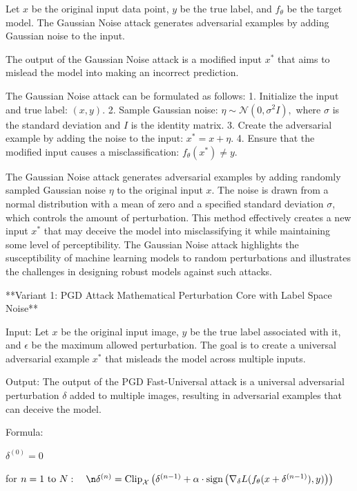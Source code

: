 
Let \( x \) be the original input data point, \( y \) be the true label, and \( f_{\theta} \) be the target model. The Gaussian Noise attack generates adversarial examples by adding Gaussian noise to the input.

The output of the Gaussian Noise attack is a modified input \( x^* \) that aims to mislead the model into making an incorrect prediction.

The Gaussian Noise attack can be formulated as follows:
1. Initialize the input and true label:
   $
   (x, y).
   $
2. Sample Gaussian noise:
   $
   \eta \sim \mathcal{N}(0, \sigma^2 I),
   $
   where \( \sigma \) is the standard deviation and \( I \) is the identity matrix.
3. Create the adversarial example by adding the noise to the input:
   $
   x^* = x + \eta.
   $
4. Ensure that the modified input causes a misclassification:
   $
   f_{\theta}(x^*) \neq y.
   $

The Gaussian Noise attack generates adversarial examples by adding randomly sampled Gaussian noise \( \eta \) to the original input \( x \). The noise is drawn from a normal distribution with a mean of zero and a specified standard deviation \( \sigma \), which controls the amount of perturbation. This method effectively creates a new input \( x^* \) that may deceive the model into misclassifying it while maintaining some level of perceptibility. The Gaussian Noise attack highlights the susceptibility of machine learning models to random perturbations and illustrates the challenges in designing robust models against such attacks.


**Variant 1: PGD Attack Mathematical Perturbation Core with Label Space Noise**

Input: Let $x$ be the original input image, $y$ be the true label associated with it, and $\epsilon$ be the maximum allowed perturbation. The goal is to create a universal adversarial example $x^*$ that misleads the model across multiple inputs.

Output: The output of the PGD Fast-Universal attack is a universal adversarial perturbation $\delta$ added to multiple images, resulting in adversarial examples that can deceive the model.

Formula:

$\delta^{(0)} = 0$

for $n = 1 \text{ to } N: \quad\n\delta^{(n)} = \text{Clip}_{\mathcal{X}} \left( \delta^{(n-1)} + \alpha \cdot \text{sign} \left( \nabla_\delta L(f_\theta(x + \delta^{(n-1)}), y) \right) \right)$

